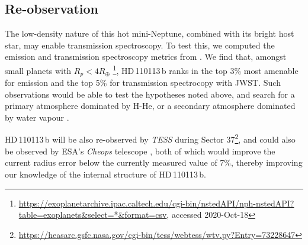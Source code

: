 \documentclass[fleqn,usenatbib]{mnras}
\newcommand{\tess}{{\it TESS}}
\newcommand{\Tplanet}{HD\,110113\,b}
\begin{document}
\subsection{Re-observation}\label{sect:future}
The low-density nature of this hot mini-Neptune, combined with its bright host star, may enable transmission spectroscopy.
To test this, we computed the emission and transmission spectroscopy metrics from \citet{kempton2018framework}. 
We find that, amongst small planets with $R_p<4R_\oplus$ \citep{akeson2013nasa}\footnote{\url{https://exoplanetarchive.ipac.caltech.edu/cgi-bin/nstedAPI/nph-nstedAPI?table=exoplanets&select=*&format=csv}, accessed 2020-Oct-18}, \Tplanet{} ranks in the top 3\% most amenable for emission and the top 5\% for transmission spectrocopy with JWST.
Such observations would be able to test the hypotheses noted above, and search for a primary atmosphere dominated by H-He, or a secondary atmosphere dominated by water vapour \citep{2020arXiv201011867B}.

\Tplanet{} will be also re-observed by \tess{} during Sector 37\footnote{\url{https://heasarc.gsfc.nasa.gov/cgi-bin/tess/webtess/wtv.py?Entry=73228647}}, and could also be observed by ESA's \textit{Cheops} telescope \citep{benz2020cheops}, both of which would improve the current radius error below the currently measured value of 7\%, thereby improving our knowledge of the internal structure of \Tplanet{}.
\end{document}
